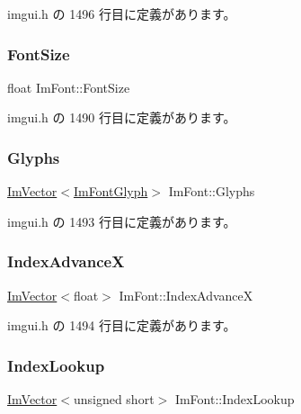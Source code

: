  imgui.\+h の 1496 行目に定義があります。

\mbox{\label{struct_im_font_a423e36d1594281f1a5a537e5b0d0a3d4}} 
\subsubsection{\texorpdfstring{Font\+Size}{FontSize}}
{\footnotesize\ttfamily float Im\+Font\+::\+Font\+Size}



 imgui.\+h の 1490 行目に定義があります。

\mbox{\label{struct_im_font_a1a0901fc1a8cbd41d582d6cef4946bc9}} 
\subsubsection{\texorpdfstring{Glyphs}{Glyphs}}
{\footnotesize\ttfamily \mbox{\hyperlink{class_im_vector}{Im\+Vector}}$<$\mbox{\hyperlink{struct_im_font_glyph}{Im\+Font\+Glyph}}$>$ Im\+Font\+::\+Glyphs}



 imgui.\+h の 1493 行目に定義があります。

\mbox{\label{struct_im_font_af906476eda06d8a842d0a843a247f530}} 
\subsubsection{\texorpdfstring{Index\+AdvanceX}{IndexAdvanceX}}
{\footnotesize\ttfamily \mbox{\hyperlink{class_im_vector}{Im\+Vector}}$<$float$>$ Im\+Font\+::\+Index\+AdvanceX}



 imgui.\+h の 1494 行目に定義があります。

\mbox{\label{struct_im_font_aaab48cbf05ca962d71ab3e7b597b992f}} 
\subsubsection{\texorpdfstring{Index\+Lookup}{IndexLookup}}
{\footnotesize\ttfamily \mbox{\hyperlink{class_im_vector}{Im\+Vector}}$<$unsigned short$>$ Im\+Font\+::\+Index\+Lookup}



